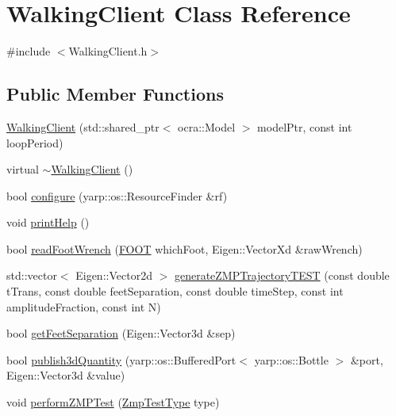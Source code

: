 \hypertarget{classWalkingClient}{\section{\-Walking\-Client \-Class \-Reference}
\label{classWalkingClient}
}


{\ttfamily \#include $<$\-Walking\-Client.\-h$>$}

\subsection*{\-Public \-Member \-Functions}
\begin{DoxyCompactItemize}
\item 
\hyperlink{classWalkingClient_a6c9002a44a54814c4b482739824e39aa}{\-Walking\-Client} (std\-::shared\-\_\-ptr$<$ ocra\-::\-Model $>$ model\-Ptr, const int loop\-Period)
\item 
virtual \hyperlink{classWalkingClient_a1dbc0308f844aea6542750104fddf8e2}{$\sim$\-Walking\-Client} ()
\item 
bool \hyperlink{classWalkingClient_adb8f972f34cb39c69c02a7c3cb493b81}{configure} (yarp\-::os\-::\-Resource\-Finder \&rf)
\item 
void \hyperlink{classWalkingClient_aff3fabef11d9c8b747a422f879c26067}{print\-Help} ()
\item 
bool \hyperlink{classWalkingClient_a03ea2313c954a97aeb4d5b614f3e6caa}{read\-Foot\-Wrench} (\hyperlink{ZmpController_8h_a4b6a8e135f90bd56e5a57a60efb42529}{\-F\-O\-O\-T} which\-Foot, \-Eigen\-::\-Vector\-Xd \&raw\-Wrench)
\item 
std\-::vector$<$ \-Eigen\-::\-Vector2d $>$ \hyperlink{classWalkingClient_a3185a8ede8bf8b1227f7dd540ba87e3c}{generate\-Z\-M\-P\-Trajectory\-T\-E\-S\-T} (const double t\-Trans, const double feet\-Separation, const double time\-Step, const int amplitude\-Fraction, const int \-N)
\item 
bool \hyperlink{classWalkingClient_a87e70046251149b4b7aff1dc57b3dcc4}{get\-Feet\-Separation} (\-Eigen\-::\-Vector3d \&sep)
\item 
bool \hyperlink{classWalkingClient_ae6d6c046a9a3e51771afe8b4c105b412}{publish3d\-Quantity} (yarp\-::os\-::\-Buffered\-Port$<$ yarp\-::os\-::\-Bottle $>$ \&port, \-Eigen\-::\-Vector3d \&value)
\item 
void \hyperlink{classWalkingClient_ae3c259f7615c85ce53a413f6e7ab4b76}{perform\-Z\-M\-P\-Test} (\hyperlink{WalkingClient_8h_afc01479a47f5a87462a54b6a9e11fffa}{\-Zmp\-Test\-Type} type)

\end{DoxyCompactItemize}
